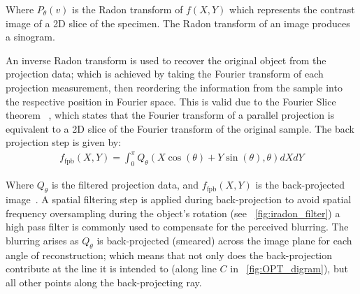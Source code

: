 \documentclass{osa-article}
\begin{document}

Where \(P_\theta(v)\) is the Radon transform of \(f(X,Y)\) which represents the contrast image of a 2D slice of the specimen.
The Radon transform of an image produces a sinogram.%



An inverse Radon transform is used to recover the original object from the projection data; which is achieved by taking the Fourier transform of each projection measurement, then reordering the information from the sample into the respective position in Fourier space.
This is valid due to the Fourier Slice theorem~\cite{bracewellStripIntegrationRadio1956a}
, which states that the Fourier transform of a parallel projection is equivalent to a 2D slice of the Fourier transform of the original sample.
The back projection step is given by:
\begin{align}
  f_{\text{fpb}}(X,Y) = \int_{0}^{\pi} Q_\theta (X\cos(\theta)+Y\sin(\theta),\theta)dXdY
\end{align}

Where \(Q_\theta \) is the filtered projection data, and \(f_{\text{fpb}}(X,Y)\) is the back-projected image~\cite{dudgeonMultidimensionalDigitalSignal1984}.
A spatial filtering step is applied during back-projection  to avoid spatial frequency oversampling during the object’s rotation (see \figurename~\ref{fig:iradon_filter})
a high pass filter is commonly used to compensate for the perceived blurring.
The blurring arises as \(Q_\theta \) is back-projected (smeared) across the image plane for each angle of reconstruction; which means that not only does the back-projection contribute at the line it is intended to (along line \(C\) in \figurename~\ref{fig:OPT_digram}), but all other points along the back-projecting ray.
\end{document}
